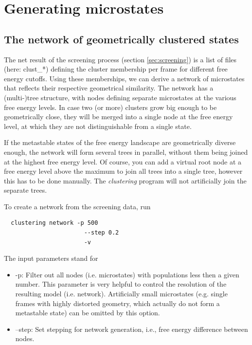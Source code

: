 \documentclass[12pt,a4paper,twoside,english,fleqn]{article}
\begin{document}
\section{Generating microstates}
\subsection{The network of geometrically clustered states
            \label{sec:network_generation}}
The net result of the screening process (section \ref{sec:screening}) is a list
of files (here: clust\_*) defining the cluster membership per frame for
different free energy cutoffs. Using these memberships, we can derive a network
of microstates that reflects their respective geometrical similarity.
The network has a (multi-)tree structure, with nodes defining separate
microstates at the various free energy levels. In case two (or more) clusters
grow big enough to be geometrically close, they will be merged into a single
node at the free energy level, at which they are not distinguishable from a
single state.

If the metastable states of the free energy landscape are geometrically diverse
enough, the network will form several trees in parallel, without them being
joined at the highest free energy level. Of course, you can add a virtual root
node at a free energy level above the maximum to join all trees into a single
tree, however this has to be done manually.
The \emph{clustering} program will not artificially join the separate trees.

To create a network from the screening data, run
\begin{lstlisting}
  clustering network -p 500
                       --step 0.2
                       -v
\end{lstlisting}
The input parameters stand for
\begin{itemize}
  \item -p: Filter out all nodes (i.e. microstates) with populations less then
            a given number. This parameter is very helpful to control the
            resolution of the resulting model (i.e. network). Artificially
            small microstates (e.g. single frames with highly distorted
            geometry, which actually do not form a metastable state) can be
            omitted by this option.
  \item --step: Set stepping for network generation, i.e., free energy
                difference between nodes.
\end{itemize}
\end{document}

